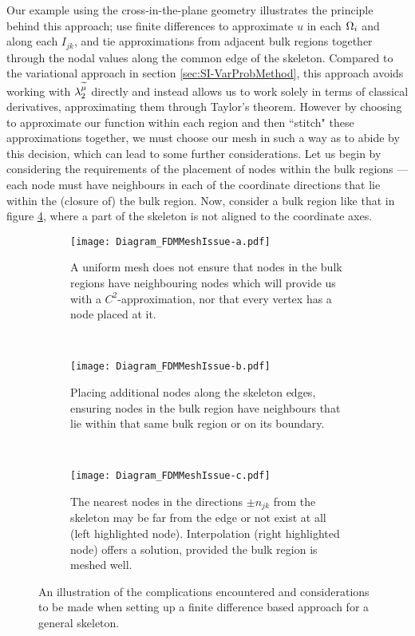Our example using the cross-in-the-plane geometry illustrates the principle behind this approach; use finite differences to approximate $u$ in each $\Omega_i$ and along each $I_{jk}$, and tie approximations from adjacent bulk regions together through the nodal values along the common edge of the skeleton.
Compared to the variational approach in section \ref{sec:SI-VarProbMethod}, this approach avoids working with $\lambda_2^{\widetilde{\mu}}$ directly and instead allows us to work solely in terms of classical derivatives, approximating them through Taylor's theorem.
However by choosing to approximate our function within each region and then ``stitch" these approximations together, we must choose our mesh in such a way as to abide by this decision, which can lead to some further considerations.
Let us begin by considering the requirements of the placement of nodes within the bulk regions --- each node must have neighbours in each of the coordinate directions that lie within the (closure of) the bulk region.
Now, consider a bulk region like that in figure \ref{fig:Diagram_FDMMeshIssue}, where a part of the skeleton is not aligned to the coordinate axes.
\begin{figure}[t]
	\centering
	\begin{subfigure}[t]{0.3\textwidth}
		\centering
		\texttt{[image: Diagram\_FDMMeshIssue-a.pdf]}
		\caption[]{\label{fig:Diagram_FDMMeshIssue-a} A uniform mesh does not ensure that nodes in the bulk regions have neighbouring nodes which will provide us with a $C^2$-approximation, nor that every vertex has a node placed at it.}
	\end{subfigure}
	~
	\begin{subfigure}[t]{0.3\textwidth}
		\centering
		\texttt{[image: Diagram\_FDMMeshIssue-b.pdf]}
		\caption[]{\label{fig:Diagram_FDMMeshIssue-b} Placing additional nodes along the skeleton edges, ensuring nodes in the bulk region have neighbours that lie within that same bulk region or on its boundary.}
	\end{subfigure}
	~
	\begin{subfigure}[t]{0.3\textwidth}
		\centering
		\texttt{[image: Diagram\_FDMMeshIssue-c.pdf]}
		\caption[]{\label{fig:Diagram_FDMMeshIssue-c} The nearest nodes in the directions $\pm n_{jk}$ from the skeleton may be far from the edge or not exist at all (left highlighted node). Interpolation (right highlighted node) offers a solution, provided the bulk region is meshed well.}
	\end{subfigure}
	\caption[Considerations for the placement of mesh nodes when handling arbitrary skeleton geometries.]{\label{fig:Diagram_FDMMeshIssue} An illustration of the complications encountered and considerations to be made when setting up a finite difference based approach for a general skeleton.}
\end{figure}
